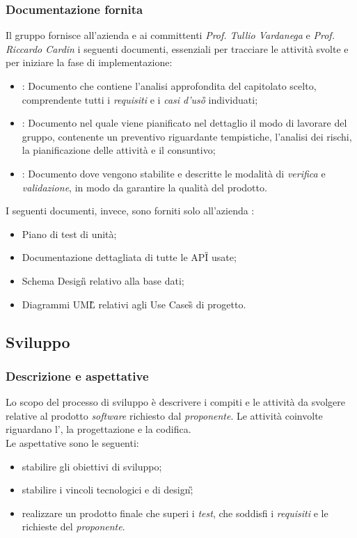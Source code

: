 \subsubsection{Documentazione fornita}
Il gruppo fornisce all'azienda \proponente{} e ai committenti \textit{Prof. Tullio Vardanega} e \textit{Prof. Riccardo Cardin} i seguenti documenti, essenziali per tracciare le attività svolte e per iniziare la fase di implementazione:
\begin{itemize}
	\item \AdR{}: Documento che contiene l'analisi approfondita del capitolato scelto, comprendente tutti i \emph{requisiti} e i \emph{casi d'uso\G{}} individuati;
	\item \PdP{}: Documento nel quale viene pianificato nel dettaglio il modo di lavorare del gruppo, contenente un preventivo riguardante tempistiche, l'analisi dei rischi, la pianificazione delle attività e il consuntivo;
	\item \PdQ{}: Documento dove vengono stabilite e descritte le modalità di \emph{verifica} e \emph{validazione}, in modo da garantire la qualità del prodotto.  
\end{itemize}
\aCapo{}
I seguenti documenti, invece, sono forniti solo all'azienda \proponente{}:
\begin{itemize}
	\item Piano di test di unità;
	\item Documentazione dettagliata di tutte le API\G{} usate;
	\item Schema Design\G{} relativo alla base dati;
	\item Diagrammi UML\G{} relativi agli Use Cases\G{} di progetto.
\end{itemize}

\subsection{Sviluppo}
\subsubsection{Descrizione e aspettative}
Lo scopo del processo di sviluppo è descrivere i compiti e le attività da svolgere relative al prodotto \emph{software} richiesto dal \emph{proponente}.
Le attività coinvolte riguardano l'\AdR{}, la progettazione e la codifica. \\
Le aspettative sono le seguenti:
\begin{itemize}
	\item stabilire gli obiettivi di sviluppo;
	\item stabilire i vincoli tecnologici e di design\G;
	\item realizzare un prodotto finale che superi i \emph{test}, che soddisfi i \emph{requisiti} e le richieste del \emph{proponente}. 
\end{itemize}

